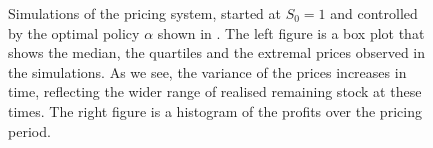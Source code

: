 \documentclass[main.tex]{subfiles}
\begin{document}
\begin{figure}[htbp]
  \caption{Simulations of the pricing system, started at $S_0=1$ %
    and
    controlled by the optimal policy $\alpha$ shown in
    .
    The left figure is a box plot
    that shows the median, the quartiles and the extremal prices observed
    in the simulations.
    As we see, the variance of the prices increases
    in time, reflecting the wider range of realised remaining stock at these times.
    The right figure is a histogram of the profits over
    the pricing period.
  }\label{fig:bellman_simulation}
\end{figure}


\biblio
\end{document}
